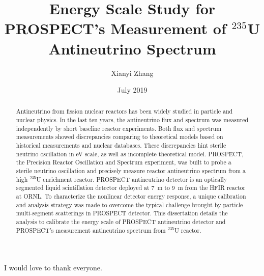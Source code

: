 \documentclass[nofootinbib]{iit}%
\author{Xianyi Zhang}
\title{Energy Scale Study for PROSPECT's Measurement of $^{235}$U Antineutrino Spectrum}
\date{July 2019}
\begin{document}
\maketitle

\prelimpages
\begin{acknowledgement}
\setcounter{page}{3}
    I would love to thank everyone.
\end{acknowledgement}

\newpage
\tableofcontents

\newpage
\listoftables

\newpage
\listoffigures

\newpage
\begin{abstract}
\setlength{\parindent}{0.5in}
    Antineutrino from fission nuclear reactors has been widely studied in particle and nuclear physics.
    In the last ten years, the antineutrino flux and spectrum was measured independently by short baseline reactor experiments. 
    Both flux and spectrum measurements showed discrepancies comparing to theoretical models based on historical measurements and nuclear databases.
    These discrepancies hint sterile neutrino oscillation in eV scale, as well as incomplete theoretical model. 
    PROSPECT, the Precision Reactor Oscillation and Spectrum experiment, was built to probe a sterile neutrino oscillation and precisely measure reactor antineutrino spectrum from a high $^{235}$U enrichment reactor.
    PROSPECT antineutrino detector is an optically segmented liquid scintillation detector deployed at 7~m to 9~m from the HFIR reactor at ORNL.
    To characterize the nonlinear detector energy response, a unique calibration and analysis strategy was made to overcome the typical challenge brought by particle multi-segment scatterings in PROSPECT detector.
    This dissertation details the analysis to calibrate the energy scale of PROSPECT antineutrino detector and PROSPECT's measurement antineutrino spectrum from $^{235}$U reactor.
    
\end{abstract}

\textpages
{}



















\end{document}
